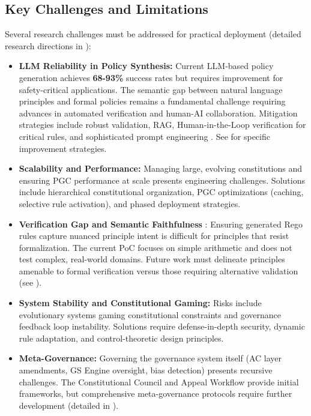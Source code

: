 \documentclass[sigconf,natbib]{acmart}
\begin{document}
\subsection{Key Challenges and Limitations}
\label{subsec:challenges_limitations}
Several research challenges must be addressed for practical deployment (detailed research directions in ):
\begin{itemize}
    \item \textbf{LLM Reliability in Policy Synthesis:} Current LLM-based policy generation achieves \textbf{68-93\%} success rates but requires improvement for safety-critical applications. The semantic gap between natural language principles and formal policies remains a fundamental challenge requiring advances in automated verification and human-AI collaboration. Mitigation strategies include robust validation, RAG, Human-in-the-Loop verification for critical rules, and sophisticated prompt engineering \cite{Taeihagh2025Governing, AAAI2025CodeHalu}. See  for specific improvement strategies.
    \item \textbf{Scalability and Performance:} Managing large, evolving constitutions and ensuring PGC performance at scale presents engineering challenges. Solutions include hierarchical constitutional organization, PGC optimizations (caching, selective rule activation), and phased deployment strategies.
    \item \textbf{Verification Gap and Semantic Faithfulness} \label{subsec:verification_gap}: Ensuring generated Rego rules capture nuanced principle intent is difficult for principles that resist formalization. The current PoC focuses on simple arithmetic and does not test complex, real-world domains. Future work must delineate principles amenable to formal verification versus those requiring alternative validation (see ).
    \item \textbf{System Stability and Constitutional Gaming:} Risks include evolutionary systems gaming constitutional constraints and governance feedback loop instability. Solutions require defense-in-depth security, dynamic rule adaptation, and control-theoretic design principles.
    \item \textbf{Meta-Governance:} Governing the governance system itself (AC layer amendments, GS Engine oversight, bias detection) presents recursive challenges. The Constitutional Council and Appeal Workflow provide initial frameworks, but comprehensive meta-governance protocols require further development (detailed in ).
\end{itemize}
\end{document}

